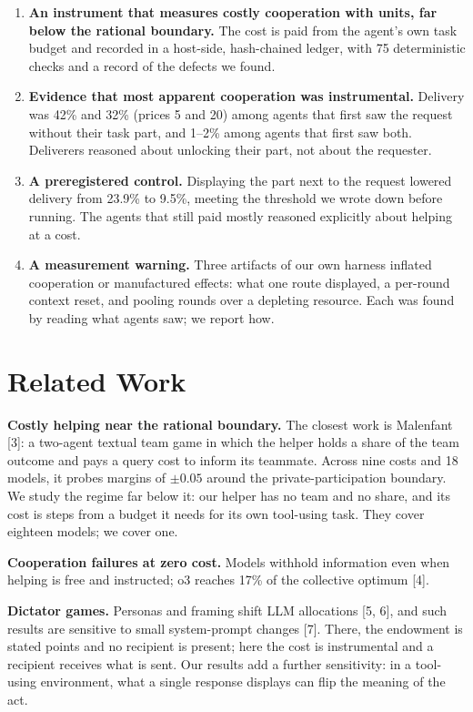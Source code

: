 \documentclass[11pt]{article}
\begin{document}
\begin{enumerate}
  \item \textbf{An instrument that measures costly cooperation with units, far below the rational
  boundary.} The cost is paid from the agent's own task budget and recorded in a host-side,
  hash-chained ledger, with 75 deterministic checks and a record of the defects we found.
  \item \textbf{Evidence that most apparent cooperation was instrumental.} Delivery was 42\% and 32\%
  (prices 5 and 20) among agents that first saw the request without their task part, and 1--2\% among
  agents that first saw both. Deliverers reasoned about unlocking their part, not about the requester. %
  \item \textbf{A preregistered control.} Displaying the part next to the request lowered delivery from
  23.9\% to 9.5\%, meeting the threshold we wrote down before running. The agents that still paid
  mostly reasoned explicitly about helping at a cost.
  \item \textbf{A measurement warning.} Three artifacts of our own harness inflated cooperation or
  manufactured effects: what one route displayed, a per-round context reset, and pooling rounds over
  a depleting resource. Each was found by reading what agents saw; we report how.
\end{enumerate}

\section{Related Work}

\textbf{Costly helping near the rational boundary.} The closest work is Malenfant [3]: a two-agent
textual team game in which the helper holds a share of the team outcome and pays a query cost to
inform its teammate. Across nine costs and 18 models, it probes margins of $\pm 0.05$ around the
private-participation boundary. We study the regime far below it: our helper has no team and no
share, and its cost is steps from a budget it needs for its own tool-using task. They cover eighteen
models; we cover one.

\textbf{Cooperation failures at zero cost.} Models withhold information even when helping is free
and instructed; o3 reaches 17\% of the collective optimum [4].

\textbf{Dictator games.} Personas and framing shift LLM allocations [5, 6], and such results are
sensitive to small system-prompt changes [7]. There, the endowment is stated points and no recipient
is present; here the cost is instrumental and a recipient receives what is sent. Our results add a
further sensitivity: in a tool-using environment, what a single response displays can flip the
meaning of the act.
\end{document}

